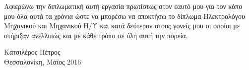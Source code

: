 
\cleardoublepage

\begin{dedication}
\par
Αφιερώνω την διπλωματική αυτή εργασία πρωτίστως στον εαυτό μου για τον κόπο μου όλα αυτά τα χρόνια ώστε να μπορέσω να αποκτήσω το δίπλωμα Ηλεκτρολόγου Μηχανικού και Μηχανικού Η/Υ και κατά δεύτερον στους γονείς μου οι οποίοι με στήριξαν ανελλιπώς και με κάθε τρόπο σε όλη αυτή την πορεία.
\begin{flushright}
Κατσιλέρος Πέτρος \\
Θεσσαλονίκη, Μάϊος 2016
\end{flushright}
\end{dedication}
